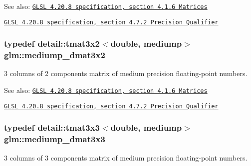 \begin{Desc}
\item[See also:]\href{http://www.opengl.org/registry/doc/GLSLangSpec.4.20.8.pdf}{\tt GLSL 4.20.8 specification, section 4.1.6 Matrices} 

\href{http://www.opengl.org/registry/doc/GLSLangSpec.4.20.8.pdf}{\tt GLSL 4.20.8 specification, section 4.7.2 Precision Qualifier} \end{Desc}
\hypertarget{group__core__precision_gff0060984716bcda68ff69ed27536bf6}{
\subsubsection[mediump\_\-dmat3x2]{\setlength{\rightskip}{0pt plus 5cm}typedef detail::tmat3x2$<$double, mediump$>$ {\bf glm::mediump\_\-dmat3x2}}}
\label{group__core__precision_gff0060984716bcda68ff69ed27536bf6}


3 columns of 2 components matrix of medium precision floating-point numbers.

\begin{Desc}
\item[See also:]\href{http://www.opengl.org/registry/doc/GLSLangSpec.4.20.8.pdf}{\tt GLSL 4.20.8 specification, section 4.1.6 Matrices} 

\href{http://www.opengl.org/registry/doc/GLSLangSpec.4.20.8.pdf}{\tt GLSL 4.20.8 specification, section 4.7.2 Precision Qualifier} \end{Desc}
\hypertarget{group__core__precision_g2f73508d8192390ca9f9b569f544fade}{
\subsubsection[mediump\_\-dmat3x3]{\setlength{\rightskip}{0pt plus 5cm}typedef detail::tmat3x3$<$double, mediump$>$ {\bf glm::mediump\_\-dmat3x3}}}
\label{group__core__precision_g2f73508d8192390ca9f9b569f544fade}


3 columns of 3 components matrix of medium precision floating-point numbers.


